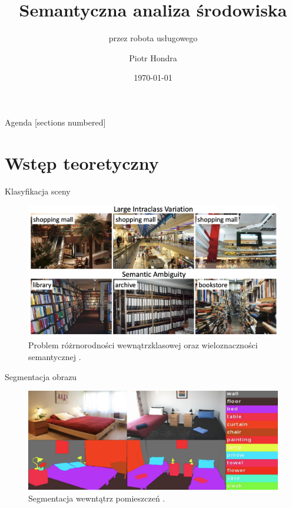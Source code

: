 \documentclass[10pt]{beamer}
\title{Semantyczna analiza środowiska }
\subtitle{przez robota usługowego}
\date{\today}
\date{}
\author{Piotr Hondra}
\institute{}
\begin{document}
\maketitle

\begin{frame}{Agenda}
  [sections numbered]
  \tableofcontents%
\end{frame}
\section[Wstęp teoretyczny]{Wstęp teoretyczny}

\begin{frame}{Klasyfikacja sceny}
  \begin{figure}
    \includegraphics[width=\textwidth]{images/scene_class.png}
    \caption{Problem różrnorodności wewnątrzklasowej oraz wieloznaczności semantycznej \cite{zeng2021deep}.}
  \end{figure}
  
\end{frame}
\begin{frame}{Segmentacja obrazu}
    \begin{figure}
      \includegraphics[width=\textwidth]{images/segment.png}
      \caption{Segmentacja wewntątrz pomieszczeń \cite{zhang2018context}.}
    \end{figure}
    
  \end{frame}
\end{document}
